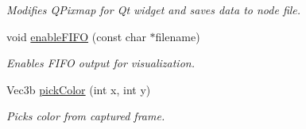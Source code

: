 \begin{DoxyCompactItemize}
\begin{DoxyCompactList}\small\item\em \-Modifies \-Q\-Pixmap for \-Qt widget and saves data to node file. \end{DoxyCompactList}\item 
void \hyperlink{classDiodeFinder_a2166fa1d7f2283c476343efd4a2f8a31}{enable\-F\-I\-F\-O} (const char $\ast$filename)
\begin{DoxyCompactList}\small\item\em \-Enables \-F\-I\-F\-O output for visualization. \end{DoxyCompactList}\item 
\-Vec3b \hyperlink{classDiodeFinder_adb6177847ec4b212f598e5111fae03bf}{pick\-Color} (int x, int y)
\begin{DoxyCompactList}\small\item\em \-Picks color from captured frame. \end{DoxyCompactList}\end{DoxyCompactItemize}
